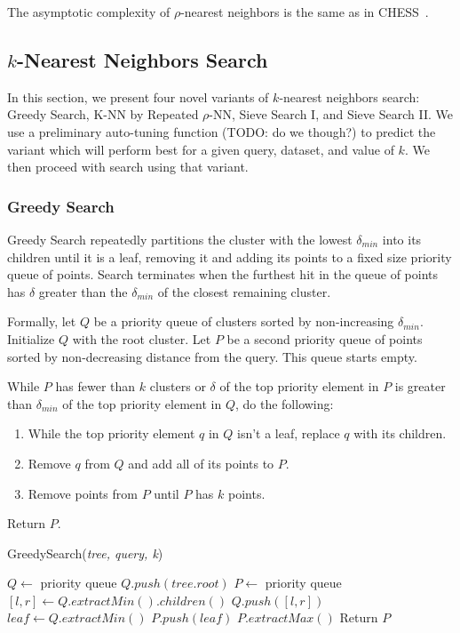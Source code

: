 The asymptotic complexity of $\rho$-nearest neighbors is the same as in CHESS~\cite{ishaq2019clustered}.

\subsection{\texorpdfstring{$k$}{k}-Nearest Neighbors Search}
\label{subsec:methods:knn-search}

In this section, we present four novel variants of $k$-nearest neighbors search: Greedy Search, K-NN by Repeated $\rho$-NN, Sieve Search I, and Sieve Search II. 
We use a preliminary auto-tuning function (TODO: do we though?) to predict the variant which will perform 
best for a given query, dataset, and value of $k$. We then proceed with search using that variant.  

\subsubsection{Greedy Search}
\label{subsubsec:methods:knn-search:greedy-search}
Greedy Search repeatedly partitions the cluster with the lowest $\delta_{min}$ into its children 
until it is a leaf, removing it and adding its points to a fixed size priority queue of points. Search terminates 
when the furthest hit in the queue of points has $\delta$ greater than the $\delta_{min}$ of the closest remaining
cluster.

Formally, let $Q$ be a priority queue of clusters sorted by non-increasing $\delta_{min}$. Initialize $Q$ with the root cluster.
Let $P$ be a second priority queue of points sorted by non-decreasing distance from the query. This queue starts empty.

While $P$ has fewer than $k$ clusters or $\delta$ of the top priority element in $P$ is greater 
than $\delta_{min}$ of the top priority element in $Q$, do the following:
\begin{enumerate}
\item While the top priority element $q$ in $Q$ isn't a leaf, replace $q$ with its children.
\item Remove $q$ from $Q$ and add all of its points to $P$. 
\item Remove points from $P$ until $P$ has $k$ points. 
\end{enumerate}

Return $P$. 

\begin{algorithm} 
\caption{GreedySearch(\emph{tree, query, k})} 
\label{alg:greedy_search} 
\begin{algorithmic}[3]
    \STATE $Q \leftarrow$ priority queue
    \STATE $Q.push(tree.root)$
    \STATE $P \leftarrow$ priority queue
            \STATE $[l, r] \leftarrow Q.extractMin().children()$
            \STATE $Q.push([l, r])$
        \ENDWHILE
        \STATE $leaf \leftarrow Q.extractMin()$
        \STATE $P.push(leaf)$
            \STATE $P.extractMax()$
        \ENDWHILE
    \ENDWHILE
    \STATE Return $P$
\end{algorithmic}
\end{algorithm}


